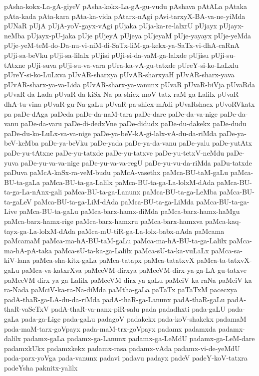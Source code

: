 {pAsha-kokx-La-gA-giyeV
pAsha-kokx-La-gA-gu-vudu
pAshava
pAtALa
pAtaka
pAta-kada
pAta-kara
pAta-ka-vida
pAtarx-nAgi
pAvi-tarxyX-BA-va-ne-yiMda
pUNaR
pUjA
pUjA-yoV-gayx-vAgi
pUjaka
pUja-ka-re-lalxrU
pUjayx
pUjayx-neMba
pUjayx-pU-jaka
pUje
pUjeyA
pUjeya
pUjeyaM
pUje-yayayx
pUje-yeMda
pUje-yeM-teM-do-Da-nu-vi-niM-di-SaTx-liM-ga-kekx-ya-SaTx-vi-dhA-caRnA
pUji-sa-beVku
pUji-sa-lilalx
pUjisi
pUji-si-da-vaM-ga-lalxde
pUjisu
pUji-su-tAtxne
pUji-suva
pUji-su-va-vara
pUra-ka-vA-gu-tatxde
pUreY-si-ko-LaLxlu
pUreY-si-ko-LuLxva
pUvAR-sharxya
pUvAR-sharxyaH
pUvAR-sharx-yava
pUvAR-sharx-ya-va-Lida
pUvAR-sharx-ya-vanunx
pUvaR
pUvaR-biVja
pUvaRda
pUvaR-da-Lada
pUvaR-da-kiSx-Na-pa-shicx-moV-tatx-raM-ga-Lalilx
pUvaR-dhA-tu-vina
pUvaR-gu-Na-gaLu
pUvaR-pa-shicx-mAdi
pUvaRshacx
pUvoRVkatx
pa
paDe-dAga
paDeda
paDe-da-naM-tara
paDe-dare
paDe-da-va-nige
paDe-da-vanu
paDe-da-varu
paDe-di-dedxVne
paDe-didudx
paDe-du-dakekx
paDe-dudu
paDe-du-ko-LuLx-va-va-nige
paDe-ya-beV-kA-gi-lalx-vA-du-da-riMda
paDe-ya-beV-keMba
paDe-ya-beVku
paDe-yada
paDe-ya-da-vanu
paDe-yalu
paDe-yutAtx
paDe-yu-tAtxne
paDe-yu-tatxde
paDe-yu-tatxve
paDe-yu-tetxV-neMdu
paDe-yuva
paDe-yu-va-va-nige
paDe-yu-va-va-regU
paDe-yu-vu-da-riMda
paDu-tatxde
paDuva
paMcA-kaSx-ra-veM-budu
paMcA-vasethx
paMca-BU-taM-gaLu
paMca-BU-ta-gaLa
paMca-BU-ta-ga-Lalilx
paMca-BU-ta-ga-La-lolxM-dAda
paMca-BU-ta-ga-La-nAnx-gali
paMca-BU-ta-ga-Lanunx
paMca-BU-ta-ga-LeMba
paMca-BU-ta-gaLeV
paMca-BU-ta-ga-LiM-dAda
paMca-BU-ta-ga-LiMda
paMca-BU-ta-ga-Live
paMca-BU-ta-gaLu
paMca-barx-hamx-diMda
paMca-barx-hamx-haMgu
paMca-barx-hamx-rige
paMca-barx-hamxru
paMca-barx-hamxva
paMca-kaq-tayx-ga-La-lolxM-dAda
paMca-mU-tiR-ga-La-lolx-babx-nAda
paMcama
paMcamaM
paMca-ma-hA-BU-taM-gaLu
paMca-ma-hA-BU-ta-ga-Lalilx
paMca-ma-hA-pA-taka
paMca-sU-ta-ka-ga-Lalilx
paMca-sU-ta-ka-vuLaLx
paMca-sa-kiV-lana
paMca-sha-kitx-gaLa
paMca-tatapx
paMca-tatatxvX
paMca-ta-tatxvX-gaLu
paMca-va-katxrXva
paMceVM-dirxya
paMceVM-dirx-ya-ga-LA-gu-tatxve
paMceVM-dirx-ya-ga-Lalilx
paMceVM-dirx-ya-gaLu
paMciV-ka-raNa
paMciV-ka-ra-Nada
paMciV-ka-ra-Na-diMda
paMtha-gaLa
paTaTx
paTaTxM
pacecxya
padA-thaR-ga-LA-du-da-riMda
padA-thaR-ga-Lanunx
padA-thaR-gaLu
padA-thaR-vaSeTxV
padA-thaR-va-nanx-piR-salu
pada
padadhxti
pada-gaLU
pada-gaLa
pada-ga-Lige
pada-gaLu
padagoV
padakekx
pada-koV-shakekx
padamaM
pada-maM-tarx-goVpayx
pada-maM-trx-goVpayx
padamx
padamxda
padamx-dalilx
padamx-gaLa
padamx-ga-Lanunx
padamx-ga-LeMdU
padamx-ga-LeM-dare
padamxkUkx
padamxkekx
padamx-rasa
padamx-vAda
padamx-vi-de-yeMdU
pada-parx-yoVga
pada-vanunx
padavi
padavu
padayx
padeV
padeY-koV-tatxra
padeYsha
paknitx-yalilx
}
